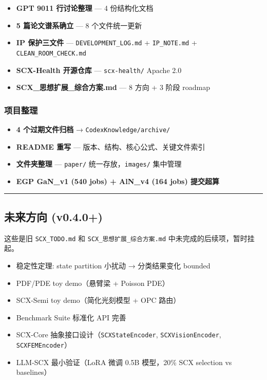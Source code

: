 \documentclass[
  12pt,
]{ctexart}
\providecommand{\tightlist}{%
  \setlength{\itemsep}{0pt}\setlength{\parskip}{0pt}}
\begin{document}
\begin{itemize}
\tightlist
\item[$\boxtimes$]
  \textbf{GPT 9011 行讨论整理} --- 4 份结构化文档
\item[$\boxtimes$]
  \textbf{5 篇论文谱系确立} --- 8 个文件统一更新
\item[$\boxtimes$]
  \textbf{IP 保护三文件} --- \texttt{DEVELOPMENT\_LOG.md} +
  \texttt{IP\_NOTE.md} + \texttt{CLEAN\_ROOM\_CHECK.md}
\item[$\boxtimes$]
  \textbf{SCX-Health 开源仓库} --- \texttt{scx-health/} Apache 2.0
\item[$\boxtimes$]
  \textbf{SCX\_思想扩展\_综合方案.md} --- 8 方向 + 3 阶段 roadmap
\end{itemize}

\subsubsection{项目整理}\label{ux9879ux76eeux6574ux7406}

\begin{itemize}
\tightlist
\item[$\boxtimes$]
  \textbf{4 个过期文件归档} → \texttt{CodexKnowledge/archive/}
\item[$\boxtimes$]
  \textbf{README 重写} --- 版本、结构、核心公式、关键文件索引
\item[$\boxtimes$]
  \textbf{文件夹整理} --- \texttt{paper/} 统一存放，\texttt{images/}
  集中管理
\item[$\boxtimes$]
  \textbf{EGP GaN\_v1 (540 jobs) + AlN\_v4 (164 jobs) 提交超算}
\end{itemize}

\begin{center}\rule{0.5\linewidth}{0.5pt}\end{center}

\subsection{未来方向 (v0.4.0+)}\label{ux672aux6765ux65b9ux5411-v0.4.0}

这些是旧 \texttt{SCX\_TODO.md} 和 \texttt{SCX\_思想扩展\_综合方案.md}
中未完成的后续项，暂时挂起。

\begin{itemize}
\tightlist
\item[$\square$]
  稳定性定理: state partition 小扰动 → 分类结果变化 bounded
\item[$\square$]
  PDF/PDE toy demo（悬臂梁 + Poisson PDE）
\item[$\square$]
  SCX-Semi toy demo（简化光刻模型 + OPC 路由）
\item[$\square$]
  Benchmark Suite 标准化 API 完善
\item[$\square$]
  SCX-Core 抽象接口设计（\texttt{SCXStateEncoder},
  \texttt{SCXVisionEncoder}, \texttt{SCXFEMEncoder}）
\item[$\square$]
  LLM-SCX 最小验证（LoRA 微调 0.5B 模型，20\% SCX selection vs
  baselines）
\end{itemize}
\end{document}
